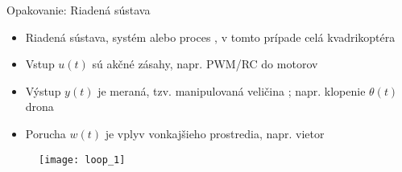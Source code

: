 %
%
%


%


\begin{frame}{Opakovanie: Riadená sústava}
  \begin{itemize}
    \item<1-> Riadená sústava, systém alebo proces , v tomto prípade celá kvadrikoptéra 
    \item<2-> Vstup $u(t)$  sú akčné zásahy, napr. PWM/RC do motorov
    \item<3-> Výstup $y(t)$  je meraná, tzv. manipulovaná veličina ; napr. klopenie $\theta(t)$ drona
    \item<4-> Porucha  $w(t)$ je vplyv vonkajšieho prostredia, napr. vietor
  \end{itemize}

\begin{figure}
\centering
  \texttt{[image: loop\_1]}\\
\end{figure}
\end{frame}

